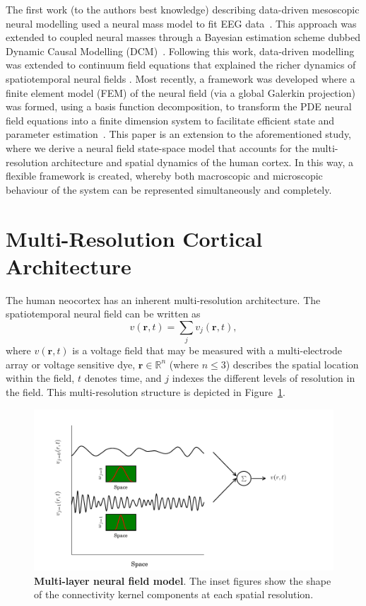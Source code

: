 \documentclass[review,authoryear,3p]{elsarticle}
\begin{document}
The first work (to the authors best knowledge) describing data-driven mesoscopic neural modelling used a neural mass model to fit EEG data~\citep{Valdes1999}. This approach was extended to coupled neural masses through a Bayesian estimation scheme dubbed Dynamic Causal Modelling (DCM)~\citep{David2003}. Following this work, data-driven modelling was extended to continuum field equations that explained the richer dynamics of spatiotemporal neural fields \citep{Galka2008,schiff2008kalman,Daunizeau2009}. Most recently, a framework was developed where a finite element model (FEM) of the neural field (via a global Galerkin projection) was formed, using a basis function decomposition, to transform the PDE neural field equations into a finite dimension system to facilitate efficient state and parameter estimation~\citep{Freestone2011}. This paper is an extension to the aforementioned study, where we derive a neural field state-space model that accounts for the multi-resolution architecture and spatial dynamics of the human cortex. In this way, a flexible framework is created, whereby both macroscopic and microscopic behaviour of the system can be represented simultaneously and completely.

\section{Multi-Resolution Cortical Architecture}
The human neocortex has an inherent multi-resolution architecture. The spatiotemporal neural field can be written as 
\begin{equation}
	v\left(\mathbf{r},t\right) = \sum_{j} v_j\left(\mathbf{r},t\right),
\end{equation}
where $v\left(\mathbf{r},t\right)$ is a voltage field that may be measured with a multi-electrode array or voltage sensitive dye, $\mathbf{r}\in \mathbb{R}^n$ (where $n\le3$) describes the spatial location within the field, $t$ denotes time, and $j$ indexes the different levels of resolution in the field. This multi-resolution structure is depicted in Figure~\ref{fig:MultiLayerFieldModel}.
\begin{figure}[t]
	\centering
		\includegraphics[scale=1]{./Graph/MultiResNeuralField.pdf}
	\caption{{\bf Multi-layer neural field model}. The inset figures show the shape of the
connectivity kernel components at each spatial resolution.}
	\label{fig:MultiLayerFieldModel}
\end{figure}
\end{document}
